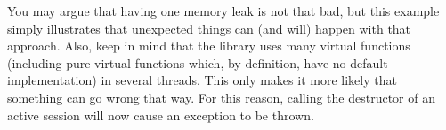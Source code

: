 You may argue that having one memory leak is not that bad, but this example simply
illustrates that unexpected things can (and will) happen with that approach.
Also, keep in mind that the library uses many virtual functions (including
pure virtual functions which, by definition, have no default implementation)
in several threads. This only makes it more likely that something can go wrong
that way. For this reason, calling the destructor of an active session will
now cause an exception to be thrown.

